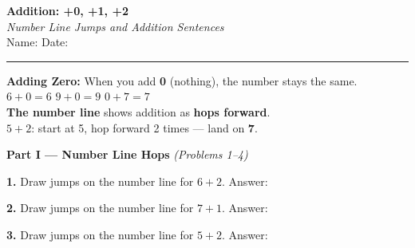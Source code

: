 \documentclass[12pt, letterpaper]{article}
\newcommand{\answerline}{\underline{\hspace{2.5cm}}}
\newcommand{\biganswerline}{\underline{\hspace{4cm}}}
\begin{document}
\begin{center}
  {\LARGE\textbf{\textcolor{scholared}{Addition: +0, +1, +2}}}\\[4pt]
  {\Large\textcolor{scholagold}{\textit{Number Line Jumps and Addition Sentences}}}\\[6pt]
  {\small Name: \biganswerline \hspace{1cm} Date: \answerline}
\end{center}

\vspace{4pt}
\noindent\textcolor{scholared}{\rule{\linewidth}{1pt}}
\vspace{4pt}


\begin{lessonbox}
\textbf{Adding Zero:} When you add \textbf{0} (nothing), the number stays the same.\\[4pt]
$6 + 0 = 6$ \quad $9 + 0 = 9$ \quad $0 + 7 = 7$\\[6pt]
\textbf{The number line} shows addition as \textbf{hops forward}.\\
$5 + 2$: start at 5, hop forward 2 times — land on \textbf{7}.
\end{lessonbox}

\bigskip

\noindent\textcolor{scholared}{\large\textbf{Part I — Number Line Hops}} \hfill \textit{(Problems 1–4)}

\begin{center}
\end{center}

\bigskip
\noindent\textbf{1.} Draw jumps on the number line for $6 + 2$. Answer: \hfill \answerline

\bigskip
\noindent\textbf{2.} Draw jumps on the number line for $7 + 1$. Answer: \hfill \answerline

\bigskip
\noindent\textbf{3.} Draw jumps on the number line for $5 + 2$. Answer: \hfill \answerline
\end{document}

